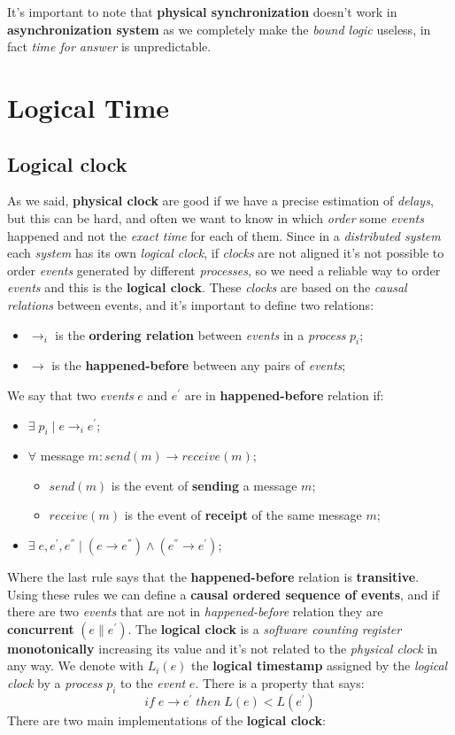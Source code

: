\documentclass{article}
\begin{document}
It's important to note that \textbf{physical synchronization} doesn't work in \textbf{asynchronization system} as we completely make the \emph{bound logic} useless, in fact \emph{time for answer} is unpredictable.
\section{Logical Time}
\subsection{Logical clock}
As we said, \textbf{physical clock} are good if we have a precise estimation of \emph{delays}, but this can be hard, and often we want to know in which \emph{order} some \emph{events} happened and not the \emph{exact time} for each of them. Since in a \emph{distributed system} each \emph{system} has its own \emph{logical clock}, if \emph{clocks} are not aligned it's not possible to order \emph{events} generated by different \emph{processes}, so we need a reliable way to order \emph{events} and this is the \textbf{logical clock}. These \emph{clocks} are based on the \emph{causal relations} between events, and it's important to define two relations:
\begin{itemize}
\item $\rightarrow_i$ is the \textbf{ordering relation} between \emph{events} in a \emph{process} $p_i$;
\item $\rightarrow$ is the \textbf{happened-before} between any pairs of \emph{events};
\end{itemize}
We say that two \emph{events} $e$ and $e^{'}$ are in \textbf{happened-before} relation if:
\begin{itemize}
\item $\exists\; p_i\; |\; e \rightarrow_i e^{'}$;
\item $\forall$ message $m: send(m) \rightarrow receive(m)$;
\begin{itemize}
\item $send(m)$ is the event of \textbf{sending} a message $m$;
\item $receive(m)$ is the event of \textbf{receipt} of the same message $m$;
\end{itemize}
\item $\exists\; e, e^{'}, e^{''} \; | \; (e \rightarrow e^{''}) \wedge (e^{''} \rightarrow e^{'})$;
\end{itemize}
Where the last rule says that the \textbf{happened-before} relation is \textbf{transitive}. Using these rules we can define a \textbf{causal ordered sequence of events}, and if there are two \emph{events} that are not in \emph{happened-before} relation they are \textbf{concurrent} $(e \parallel e^{'})$. 
The \textbf{logical clock} is a \emph{software counting register} \textbf{monotonically} increasing its value and it's not related to the \emph{physical clock} in any way. We denote with $L_i(e)$ the \textbf{logical timestamp} assigned by the \emph{logical clock} by a \emph{process} $p_i$ to the \emph{event} $e$. There is a property that says: 
\[ if\; e \rightarrow e^{'}\; then\; L(e) < L(e^{'}) \]
There are two main implementations of the \textbf{logical clock}:
\end{document}
